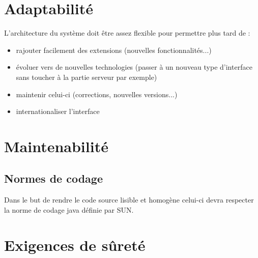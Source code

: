 \section{Adaptabilité}

L'architecture du système doit être assez flexible pour permettre plus tard de : \\

\begin{itemize}
\item  rajouter facilement des extensions (nouvelles fonctionnalités...)
\item  évoluer vers de nouvelles technologies (passer à un nouveau type d'interface sans toucher à la partie serveur par exemple)
\item  maintenir celui-ci (corrections, nouvelles versions...)
\item  internationaliser l'interface\\
\end{itemize}


	\section{Maintenabilité}
	

	\subsection{Normes de codage}
	Dans le but de rendre le code source lisible et homogène celui-ci devra respecter la norme de codage java définie par SUN.

	
	

	\section{Exigences de sûreté}

